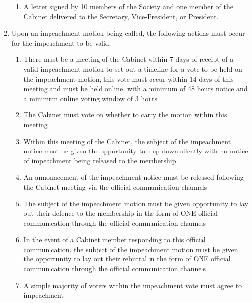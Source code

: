 \documentclass[parskip=half]{scrartcl}
\begin{document}
\begin{enumerate}
\begin{enumerate}
                        \item A letter signed by 10 members of the Society and one member of the Cabinet delivered to the Secretary, Vice-President, or President.
                    \end{enumerate}
                \item Upon an impeachment motion being called, the following actions must occur for the impeachment to be valid:
                    \begin{enumerate}
                        \item There must be a meeting of the Cabinet within 7 days of receipt of a valid impeachment motion to set out a timeline for a vote to be held on the impeachment motion, this vote must occur within 14 days of this meeting and must be held online, with a minimum of 48 hours notice and a minimum online voting window of 3 hours
                        
                        \item The Cabinet must vote on whether to carry the motion within this meeting
                        
                        \item Within this meeting of the Cabinet, the subject of the impeachment notice must be given the opportunity to step down silently with no notice of impeachment being released to the membership

                        \item An announcement of the impeachment notice must be released following the Cabinet meeting via the official communication channels
                        
                        \item The subject of the impeachment motion must be given opportunity to lay out their defence to the membership in the form of ONE official communication through the official communication channels
                        
                        \item In the event of a Cabinet member responding to this official communication, the subject of the impeachment motion must be given the opportunity to lay out their rebuttal in the form of ONE official communication through the official communication channels
                        
                        \item A simple majority of voters within the impeachment vote must agree to impeachment
                    \end{enumerate}


\end{enumerate}
\end{document}
